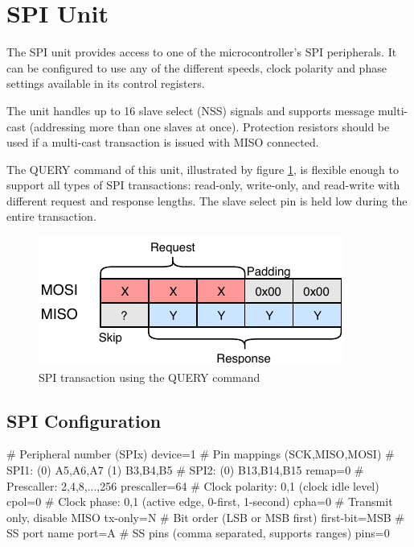 \section{SPI Unit}

The SPI unit provides access to one of the microcontroller's SPI peripherals. It can be configured to use any of the different speeds, clock polarity and phase settings available in its control registers.

The unit handles up to 16 slave select (NSS) signals and supports message multi-cast (addressing more than one slaves at once). Protection resistors should be used if a multi-cast transaction is issued with MISO connected.

The QUERY command of this unit, illustrated by figure \ref{fig:spi_query}, is flexible enough to support all types of SPI transactions: read-only, write-only, and read-write with different request and response lengths. The slave select pin is held low during the entire transaction.

\begin{figure}[h]
	\centering
	\includegraphics[scale=1.1] {img/spi-query.pdf}
	\caption{\label{fig:spi_query}SPI transaction using the QUERY command}
\end{figure}

\subsection{SPI Configuration}

\begin{inicode}
# Peripheral number (SPIx)
device=1
# Pin mappings (SCK,MISO,MOSI)
#  SPI1: (0) A5,A6,A7     (1) B3,B4,B5
#  SPI2: (0) B13,B14,B15
remap=0
# Prescaller: 2,4,8,...,256
prescaller=64
# Clock polarity: 0,1 (clock idle level)
cpol=0
# Clock phase: 0,1 (active edge, 0-first, 1-second)
cpha=0
# Transmit only, disable MISO
tx-only=N
# Bit order (LSB or MSB first)
first-bit=MSB
# SS port name
port=A
# SS pins (comma separated, supports ranges)
pins=0
\end{inicode}

